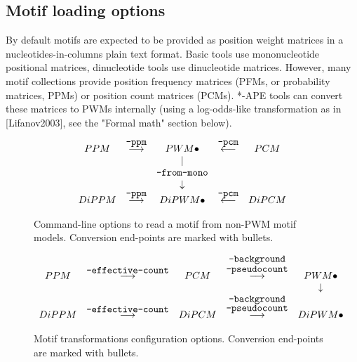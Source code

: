\subsection{Motif loading options}
By default motifs are expected to be provided as position weight matrices in a nucleotides-in-columns plain text format. Basic tools use mononucleotide positional matrices, dinucleotide tools use dinucleotide matrices. However, many motif collections provide position frequency matrices (PFMs, or probability matrices, PPMs) or position count matrices (PCMs). *-APE tools can convert these matrices to PWMs internally (using a log-odds-like transformation as in [Lifanov2003], see the "Formal math" section below).


\begin{figure}[h]
\centering
$$\begin{array}{ccccc}
PPM     &  \stackrel{\mbox{\texttt{--ppm}}}{\longrightarrow}  & PWM \bullet               & \stackrel{\mbox{\texttt{--pcm}}}{\longleftarrow}  &  PCM  \\
        &                                                 &          |                &                                               &  \\
        &                                                 & \mbox{\texttt{--from-mono}}   &                                               &  \\
        &                                                 &     \downarrow            &                                               &  \\
DiPPM   &  \stackrel{\mbox{\texttt{--ppm}}}{\longrightarrow}  & DiPWM \bullet             & \stackrel{\mbox{\texttt{--pcm}}}{\longleftarrow}  &  DiPCM
\end{array}$$
\caption{Command-line options to read a motif from non-PWM motif models. Conversion end-points are marked with bullets.}\label{motif-conversion-types}
\end{figure}


\begin{figure}[h]
\centering
$$\begin{array}{ccccc}
PPM   & \stackrel{\mbox{\texttt{--effective-count}}}{\longrightarrow} & PCM   & \stackrel{\mbox{\texttt{--background}}}{\stackrel{\mbox{\texttt{--pseudocount}}}{\longrightarrow}} & PWM \bullet \\
      &                                                           &       &                                                                                            & \downarrow \\
DiPPM & \stackrel{\mbox{\texttt{--effective-count}}}{\longrightarrow} & DiPCM & \stackrel{\stackrel{\mbox{\texttt{--background}}}{\mbox{\texttt{--pseudocount}}}}{\longrightarrow} & DiPWM \bullet
\end{array}$$
\caption{Motif transformations configuration options. Conversion end-points are marked with bullets.}\label{motif-conversion-configuration}
\end{figure}


